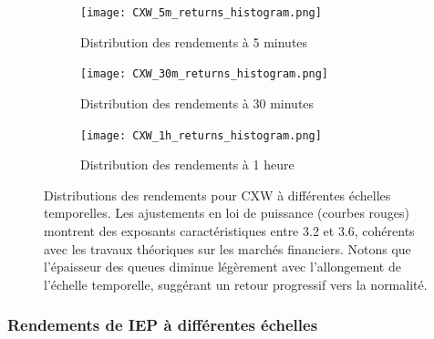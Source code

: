\documentclass[12pt,a4paper]{article}
\theoremstyle{definition}
\theoremstyle{remark}
\begin{document}
\begin{figure}[h!]
    \centering
    \begin{subfigure}[b]{0.45\textwidth}
        \texttt{[image: CXW\_5m\_returns\_histogram.png]}
        \caption{Distribution des rendements à 5 minutes}
        \label{fig:CXW_5m}
    \end{subfigure}
    \hfill
    \begin{subfigure}[b]{0.45\textwidth}
        \texttt{[image: CXW\_30m\_returns\_histogram.png]}
        \caption{Distribution des rendements à 30 minutes}
        \label{fig:CXW_30m}
    \end{subfigure}
    
    \vspace{0.5cm}
    
    \begin{subfigure}[b]{0.45\textwidth}
        \texttt{[image: CXW\_1h\_returns\_histogram.png]}
        \caption{Distribution des rendements à 1 heure}
        \label{fig:CXW_1h}
    \end{subfigure}
    \caption{Distributions des rendements pour CXW à différentes échelles temporelles. Les ajustements en loi de puissance (courbes rouges) montrent des exposants caractéristiques entre 3.2 et 3.6, cohérents avec les travaux théoriques sur les marchés financiers. Notons que l'épaisseur des queues diminue légèrement avec l'allongement de l'échelle temporelle, suggérant un retour progressif vers la normalité.}
    \label{fig:CXW_multi_scale}
\end{figure}

\subsubsection{Rendements de IEP à différentes échelles}
\end{document}
